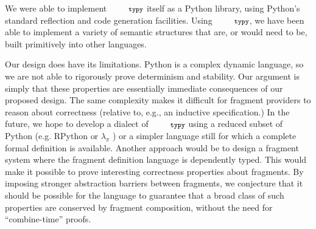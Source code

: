\documentclass[10pt]{sigplanconf}
\newcommand{\typy}{\texttt{\footnotesize typy}}
\begin{document}
We were able to implement $\typy$ itself as a Python library, using Python's standard reflection and code generation facilities. Using $\typy$, we have been able to implement a variety of semantic structures that are, or would need to be, built primitively into other languages.




Our design does have its limitations. Python is a complex dynamic language, so we are not able to rigorously prove determinism and stability. Our argument is simply that these properties are essentially immediate consequences of our proposed design. The same complexity makes it difficult for fragment providers to reason about correctness (relative to, e.g., an inductive specification.) 
In the future, we hope to develop a dialect of $\typy$ using a reduced subset of Python (e.g. RPython \cite{ancona2007rpython} or $\lambda_\pi$ \cite{Politz:2013:PFM:2509136.2509536}) or a simpler language still for which a complete formal definition is available. Another approach would be to design a fragment system where the fragment definition language is dependently typed. This would make it possible to prove interesting correctness properties about fragments. By imposing stronger abstraction barriers between fragments, we conjecture that it should be possible for the language to guarantee that a broad class of such properties are conserved by fragment composition, without the need for ``combine-time'' proofs. 
\end{document}
